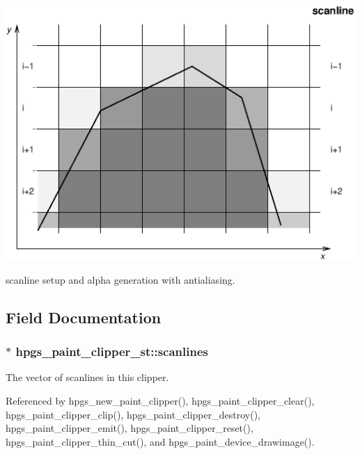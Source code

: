  \begin{Image}
\begin{center}
\includegraphics{scanline_n}\caption{scanline setup and alpha generation with antialiasing.}
\end{center}
\end{Image}


\subsection{Field Documentation}
\subsubsection[scanlines]{$\ast$ {\bf hpgs\_\-paint\_\-clipper\_\-st::scanlines}}\label{structhpgs__paint__clipper__st_0bb91ce08576e1de31698acf4edb5a53}


The vector of scanlines in this clipper. 

Referenced by hpgs\_\-new\_\-paint\_\-clipper(), hpgs\_\-paint\_\-clipper\_\-clear(), hpgs\_\-paint\_\-clipper\_\-clip(), hpgs\_\-paint\_\-clipper\_\-destroy(), hpgs\_\-paint\_\-clipper\_\-emit(), hpgs\_\-paint\_\-clipper\_\-reset(), hpgs\_\-paint\_\-clipper\_\-thin\_\-cut(), and hpgs\_\-paint\_\-device\_\-drawimage().
